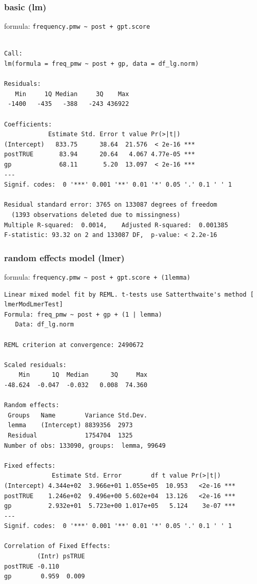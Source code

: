 \documentclass[
  letterpaper,
  DIV=11,
  numbers=noendperiod]{scrartcl}
\begin{document}
\subsubsection{basic (lm)}\label{basic-lm}

formula: \texttt{frequency.pmw\ \textasciitilde{}\ post\ +\ gpt.score}

\begin{verbatim}

Call:
lm(formula = freq_pmw ~ post + gp, data = df_lg.norm)

Residuals:
   Min     1Q Median     3Q    Max 
 -1400   -435   -388   -243 436922 

Coefficients:
            Estimate Std. Error t value Pr(>|t|)    
(Intercept)   833.75      38.64  21.576  < 2e-16 ***
postTRUE       83.94      20.64   4.067 4.77e-05 ***
gp             68.11       5.20  13.097  < 2e-16 ***
---
Signif. codes:  0 '***' 0.001 '**' 0.01 '*' 0.05 '.' 0.1 ' ' 1

Residual standard error: 3765 on 133087 degrees of freedom
  (1393 observations deleted due to missingness)
Multiple R-squared:  0.0014,    Adjusted R-squared:  0.001385 
F-statistic: 93.32 on 2 and 133087 DF,  p-value: < 2.2e-16
\end{verbatim}

\subsubsection{random effects model
(lmer)}\label{random-effects-model-lmer}

formula:
\texttt{frequency.pmw\ \textasciitilde{}\ post\ +\ gpt.score\ +\ (1\textbar{}lemma)}

\begin{verbatim}
Linear mixed model fit by REML. t-tests use Satterthwaite's method [
lmerModLmerTest]
Formula: freq_pmw ~ post + gp + (1 | lemma)
   Data: df_lg.norm

REML criterion at convergence: 2490672

Scaled residuals: 
    Min      1Q  Median      3Q     Max 
-48.624  -0.047  -0.032   0.008  74.360 

Random effects:
 Groups   Name        Variance Std.Dev.
 lemma    (Intercept) 8839356  2973    
 Residual             1754704  1325    
Number of obs: 133090, groups:  lemma, 99649

Fixed effects:
             Estimate Std. Error        df t value Pr(>|t|)    
(Intercept) 4.344e+02  3.966e+01 1.055e+05  10.953   <2e-16 ***
postTRUE    1.246e+02  9.496e+00 5.602e+04  13.126   <2e-16 ***
gp          2.932e+01  5.723e+00 1.017e+05   5.124    3e-07 ***
---
Signif. codes:  0 '***' 0.001 '**' 0.01 '*' 0.05 '.' 0.1 ' ' 1

Correlation of Fixed Effects:
         (Intr) psTRUE
postTRUE -0.110       
gp        0.959  0.009
\end{verbatim}
\end{document}
